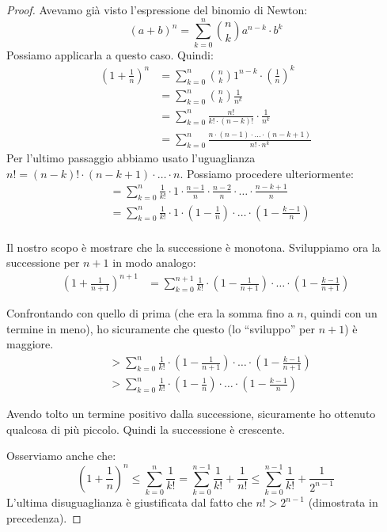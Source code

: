 \begin{proof}
Avevamo già visto l'espressione del binomio di Newton:
\begin{equation*}
(a+b)^n = \sum_{k=0}^n \binom{n}{k} a^{n-k} \cdot b^k
\end{equation*}
Possiamo applicarla a questo caso. Quindi:
\begin{align*}
\left(1+\frac{1}{n}\right)^n &= \sum_{k=0}^n \binom{n}{k} 1^{n-k} \cdot \left(\frac{1}{n}\right)^k \\
&= \sum_{k=0}^n \binom{n}{k} \frac{1}{n^k}  \\
&= \sum_{k=0}^n \frac{n!}{k! \cdot (n-k)!} \cdot \frac{1}{n^k} \\
&= \sum_{k=0}^n \frac{n \cdot (n-1) \cdot \ldots \cdot (n-k+1)}{n! \cdot n^k} 
\end{align*}
Per l'ultimo passaggio abbiamo usato l'uguaglianza $n! = (n-k)! \cdot (n-k+1) \cdot \ldots \cdot n$. Possiamo procedere ulteriormente:
\begin{align*}
&= \sum_{k=0}^n \frac{1}{k!} \cdot 1 \cdot \frac{n-1}{n} \cdot \frac{n-2}{n} \cdot \ldots \cdot \frac{n-k+1}{n} \\
&= \sum_{k=0}^n \frac{1}{k!} \cdot 1 \cdot \left(1-\frac{1}{n}\right) \cdot \ldots \cdot \left(1 - \frac{k-1}{n}\right) \\
\end{align*}

Il nostro scopo è mostrare che la successione è monotona. Sviluppiamo ora la successione per $n+1$ in modo analogo:
\begin{align*}
\left(1+\frac{1}{n+1}\right)^{n+1} &= \sum_{k=0}^{n+1} \frac{1}{k!} \cdot \left(1 - \frac{1}{n+1} \right) \cdot \ldots \cdot \left(1 - \frac{k-1}{n+1} \right)
\end{align*}

Confrontando con quello di prima (che era la somma fino a $n$, quindi con un termine in meno), ho sicuramente che questo (lo ``sviluppo'' per $n+1$) è maggiore. 
\begin{align*}
&> \sum_{k=0}^{n} \frac{1}{k!} \cdot \left(1 - \frac{1}{n+1} \right) \cdot \ldots \cdot \left(1 - \frac{k-1}{n+1} \right) \\
&> \sum_{k=0}^{n} \frac{1}{k!} \cdot \left(1 - \frac{1}{n} \right) \cdot \ldots \cdot \left(1 - \frac{k-1}{n} \right)
\end{align*}

Avendo tolto un termine positivo dalla successione, sicuramente ho ottenuto qualcosa di più piccolo. Quindi la successione è crescente.

Osserviamo anche che:
\begin{equation*}
\left(1 + \frac{1}{n}\right)^n \le \sum_{k=0}^n \frac{1}{k!} = \sum_{k=0}^{n-1} \frac{1}{k!} + \frac{1}{n!} \le \sum_{k=0}^{n-1} \frac{1}{k!} + \frac{1}{2^{n-1}}
\end{equation*}
L'ultima disuguaglianza è giustificata dal fatto che $n! > 2^{n-1}$ (dimostrata in precedenza).
\end{proof}

